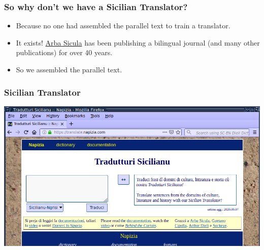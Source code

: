 \documentclass{beamer}
\begin{document}

\begin{frame}
  \frametitle{So why don't we have a Sicilian Translator?}
  \begin{itemize}
  \item Because no one had assembled the parallel text to train a translator.
  \vspace{1em}
  \item It exists! \href{http://www.arbasicula.org/}{Arba Sicula} has been publishing a
    bilingual journal (and many other publications) for over 40 years.
  \vspace{1em}
  \item So we assembled the parallel text.
  \end{itemize} 
\end{frame}


\begin{frame}
  \frametitle{Sicilian Translator}
  \includegraphics[width=\textwidth]{images/browser-white-box_v1.png}
\end{frame}

\end{document}
